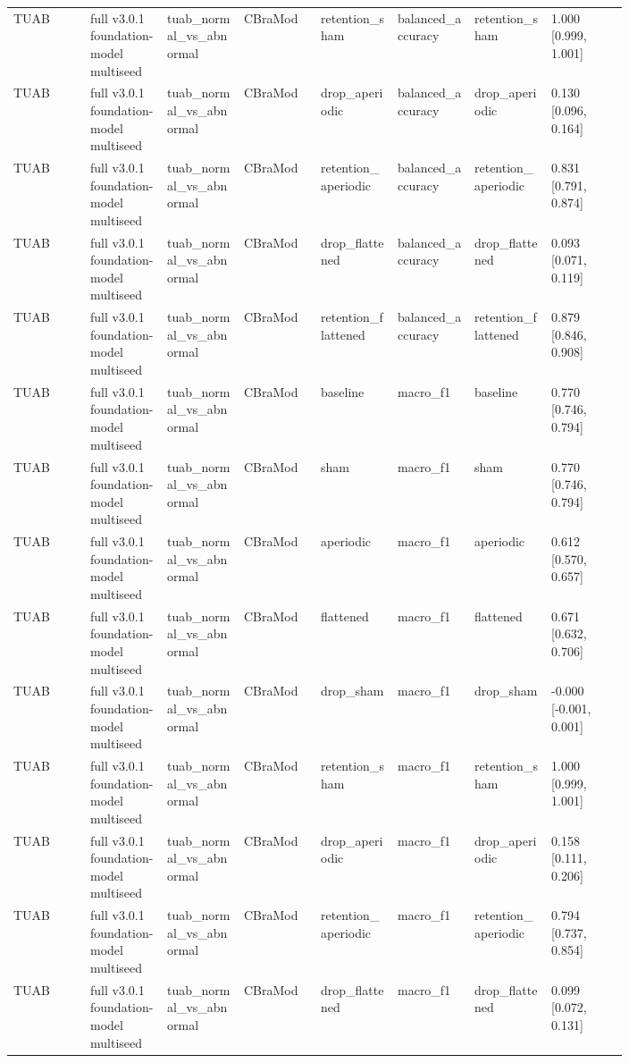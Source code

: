 \begin{longtable}{p{0.10\linewidth}p{0.10\linewidth}p{0.10\linewidth}p{0.10\linewidth}p{0.10\linewidth}p{0.10\linewidth}p{0.10\linewidth}p{0.10\linewidth}}
TUAB & full v3.0.1 foundation-model multiseed & tuab\_normal\_vs\_abnormal & CBraMod & retention\_sham & balanced\_accuracy & retention\_sham & 1.000 [0.999, 1.001]\\
TUAB & full v3.0.1 foundation-model multiseed & tuab\_normal\_vs\_abnormal & CBraMod & drop\_aperiodic & balanced\_accuracy & drop\_aperiodic & 0.130 [0.096, 0.164]\\
TUAB & full v3.0.1 foundation-model multiseed & tuab\_normal\_vs\_abnormal & CBraMod & retention\_aperiodic & balanced\_accuracy & retention\_aperiodic & 0.831 [0.791, 0.874]\\
TUAB & full v3.0.1 foundation-model multiseed & tuab\_normal\_vs\_abnormal & CBraMod & drop\_flattened & balanced\_accuracy & drop\_flattened & 0.093 [0.071, 0.119]\\
TUAB & full v3.0.1 foundation-model multiseed & tuab\_normal\_vs\_abnormal & CBraMod & retention\_flattened & balanced\_accuracy & retention\_flattened & 0.879 [0.846, 0.908]\\
TUAB & full v3.0.1 foundation-model multiseed & tuab\_normal\_vs\_abnormal & CBraMod & baseline & macro\_f1 & baseline & 0.770 [0.746, 0.794]\\
TUAB & full v3.0.1 foundation-model multiseed & tuab\_normal\_vs\_abnormal & CBraMod & sham & macro\_f1 & sham & 0.770 [0.746, 0.794]\\
TUAB & full v3.0.1 foundation-model multiseed & tuab\_normal\_vs\_abnormal & CBraMod & aperiodic & macro\_f1 & aperiodic & 0.612 [0.570, 0.657]\\
TUAB & full v3.0.1 foundation-model multiseed & tuab\_normal\_vs\_abnormal & CBraMod & flattened & macro\_f1 & flattened & 0.671 [0.632, 0.706]\\
TUAB & full v3.0.1 foundation-model multiseed & tuab\_normal\_vs\_abnormal & CBraMod & drop\_sham & macro\_f1 & drop\_sham & -0.000 [-0.001, 0.001]\\
TUAB & full v3.0.1 foundation-model multiseed & tuab\_normal\_vs\_abnormal & CBraMod & retention\_sham & macro\_f1 & retention\_sham & 1.000 [0.999, 1.001]\\
TUAB & full v3.0.1 foundation-model multiseed & tuab\_normal\_vs\_abnormal & CBraMod & drop\_aperiodic & macro\_f1 & drop\_aperiodic & 0.158 [0.111, 0.206]\\
TUAB & full v3.0.1 foundation-model multiseed & tuab\_normal\_vs\_abnormal & CBraMod & retention\_aperiodic & macro\_f1 & retention\_aperiodic & 0.794 [0.737, 0.854]\\
TUAB & full v3.0.1 foundation-model multiseed & tuab\_normal\_vs\_abnormal & CBraMod & drop\_flattened & macro\_f1 & drop\_flattened & 0.099 [0.072, 0.131]\\

\end{longtable}
